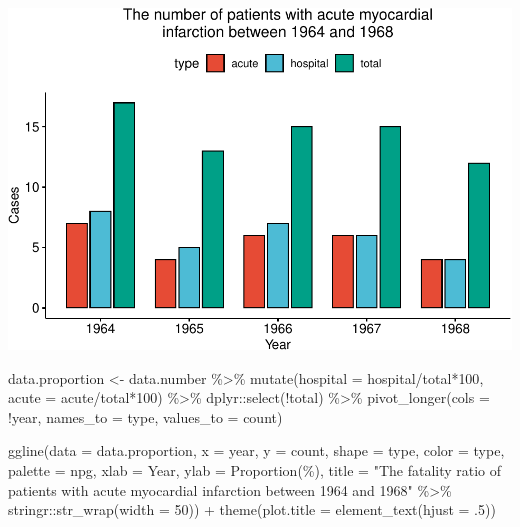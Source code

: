 \documentclass{article}
\newenvironment{Shaded}{\begin{snugshade}}{\end{snugshade}}
\newcommand{\AttributeTok}[1]{\textcolor[rgb]{0.77,0.63,0.00}{#1}}
\newcommand{\DecValTok}[1]{\textcolor[rgb]{0.00,0.00,0.81}{#1}}
\newcommand{\FunctionTok}[1]{\textcolor[rgb]{0.00,0.00,0.00}{#1}}
\newcommand{\NormalTok}[1]{#1}
\newcommand{\OtherTok}[1]{\textcolor[rgb]{0.56,0.35,0.01}{#1}}
\newcommand{\SpecialCharTok}[1]{\textcolor[rgb]{0.00,0.00,0.00}{#1}}
\newcommand{\StringTok}[1]{\textcolor[rgb]{0.31,0.60,0.02}{#1}}
\begin{document}
\includegraphics{Reference_solutions_files/figure-latex/unnamed-chunk-4-1.pdf}

\begin{Shaded}
\begin{Highlighting}[]
\NormalTok{data.proportion }\OtherTok{\textless{}{-}}\NormalTok{ data.number }\SpecialCharTok{\%\textgreater{}\%} 
  \FunctionTok{mutate}\NormalTok{(}\AttributeTok{hospital =}\NormalTok{ hospital}\SpecialCharTok{/}\NormalTok{total}\SpecialCharTok{*}\DecValTok{100}\NormalTok{, }\AttributeTok{acute =}\NormalTok{ acute}\SpecialCharTok{/}\NormalTok{total}\SpecialCharTok{*}\DecValTok{100}\NormalTok{) }\SpecialCharTok{\%\textgreater{}\%} 
\NormalTok{  dplyr}\SpecialCharTok{::}\FunctionTok{select}\NormalTok{(}\SpecialCharTok{!}\NormalTok{total) }\SpecialCharTok{\%\textgreater{}\%} 
  \FunctionTok{pivot\_longer}\NormalTok{(}\AttributeTok{cols =} \SpecialCharTok{!}\NormalTok{year, }\AttributeTok{names\_to =} \StringTok{\textquotesingle{}type\textquotesingle{}}\NormalTok{, }\AttributeTok{values\_to =} \StringTok{\textquotesingle{}count\textquotesingle{}}\NormalTok{)}

\FunctionTok{ggline}\NormalTok{(}\AttributeTok{data =}\NormalTok{ data.proportion, }\AttributeTok{x =} \StringTok{\textquotesingle{}year\textquotesingle{}}\NormalTok{, }\AttributeTok{y =} \StringTok{\textquotesingle{}count\textquotesingle{}}\NormalTok{, }\AttributeTok{shape =} \StringTok{\textquotesingle{}type\textquotesingle{}}\NormalTok{, }\AttributeTok{color =} \StringTok{\textquotesingle{}type\textquotesingle{}}\NormalTok{, }
       \AttributeTok{palette =} \StringTok{\textquotesingle{}npg\textquotesingle{}}\NormalTok{, }\AttributeTok{xlab =} \StringTok{\textquotesingle{}Year\textquotesingle{}}\NormalTok{, }\AttributeTok{ylab =} \StringTok{\textquotesingle{}Proportion(\%)\textquotesingle{}}\NormalTok{, }
       \AttributeTok{title =} \StringTok{"The fatality ratio of patients with acute myocardial }
\StringTok{       infarction between 1964 and 1968"} \SpecialCharTok{\%\textgreater{}\%}\NormalTok{ stringr}\SpecialCharTok{::}\FunctionTok{str\_wrap}\NormalTok{(}\AttributeTok{width =} \DecValTok{50}\NormalTok{)) }\SpecialCharTok{+} 
  \FunctionTok{theme}\NormalTok{(}\AttributeTok{plot.title =} \FunctionTok{element\_text}\NormalTok{(}\AttributeTok{hjust =}\NormalTok{ .}\DecValTok{5}\NormalTok{))}
\end{Highlighting}
\end{Shaded}
\end{document}
